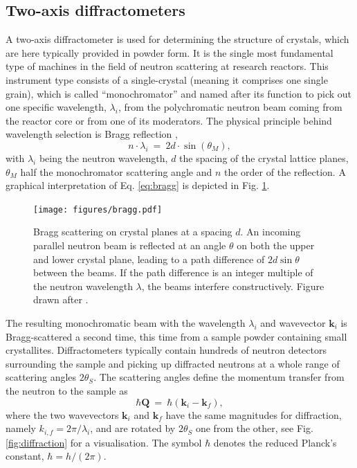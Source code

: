 \subsection{Two-axis diffractometers}

A two-axis diffractometer is used for determining the structure of crystals, which are here typically provided in powder form. It is the single most fundamental type of machines in the field of neutron scattering at research reactors. This instrument type consists of a single-crystal (meaning it comprises one single grain), which is called ``monochromator'' and named after its function to pick out one specific wavelength, $\lambda_i$, from the polychromatic neutron beam coming from the reactor core or from one of its moderators. The physical principle behind wavelength selection is Bragg reflection \cite[p. 68]{Gross2012},
\begin{equation}
	\label{eq:bragg}
	n \cdot \lambda_i \ =\  2 d \cdot \sin\left( \theta_M \right),
\end{equation}
with $\lambda_i$ being the neutron wavelength, $d$ the spacing of the crystal lattice planes, $\theta_M$ half the monochromator scattering angle and $n$ the order of the reflection. A graphical interpretation of Eq. \ref{eq:bragg} is depicted in Fig. \ref{fig:braggscattering}.

\begin{figure}[htb]
	\centering
	\texttt{[image: figures/bragg.pdf]}
	\caption{Bragg scattering on crystal planes at a spacing $d$. An incoming parallel neutron beam is reflected at an angle $\theta$ on both the upper and lower crystal plane, leading to a path difference of $2d \sin\theta$ between the beams. If the path difference is an integer multiple of the neutron wavelength $\lambda$, the beams interfere constructively. Figure drawn after \cite[p. 68, Fig. 2.7]{Gross2012}. }
	\label{fig:braggscattering}
\end{figure}

The resulting monochromatic beam with the wavelength $\lambda_i$ and wavevector $\bm{k}_i$ is Bragg-scattered a second time, this time from a sample powder containing small crystallites. Diffractometers typically contain hundreds of neutron detectors surrounding the sample and picking up diffracted neutrons at a whole range of scattering angles $2 \theta_S$. The scattering angles define the momentum transfer from the neutron to the sample as
\begin{equation}
	\hbar \bm{Q} \ =\  \hbar \left( \bm{k}_i - \bm{k}_f \right),
\end{equation}
where the two wavevectors $\bm{k}_i$ and $\bm{k}_f$ have the same magnitudes for diffraction, namely $k_{i,f} = 2\pi / \lambda_i$, and are rotated by $2\theta_S$ one from the other, see Fig. \ref{fig:diffraction} for a visualisation. The symbol $\hbar$ denotes the reduced Planck's constant, $\hbar = h / \left( 2\pi \right)$.

